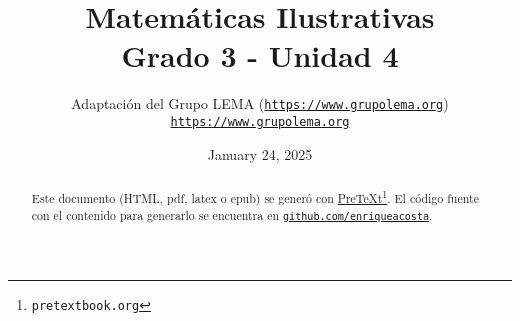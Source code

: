 
\title{Matemáticas Ilustrativas\\
{\large Grado 3 - Unidad 4}}
\author{Adaptación del Grupo LEMA (\href{https://www.grupolema.org}{\nolinkurl{https://www.grupolema.org}})\\
\href{https://www.grupolema.org}{\nolinkurl{https://www.grupolema.org}}
}
\date{January 24, 2025}

\raggedbottom
\label{gra3-uni4}\hypertarget{gra3-uni4}{}
\maketitle
\thispagestyle{empty}
\renewcommand*{\abstractname}{}
\begin{abstract}
Este documento (HTML, pdf, latex o epub) se generó con \href{https://pretextbook.org}{PreTeXt}\footnote{\nolinkurl{pretextbook.org}\label{meta-source-2-2}}. El código fuente con el contenido para generarlo se encuentra en \href{https://github.com/enriqueacosta/IllustrativeMath-GrupoLEMA}{\nolinkurl{github.com/enriqueacosta}}.%
\end{abstract}
\clearpage
\renewcommand*{\abstractname}{Resumen}
